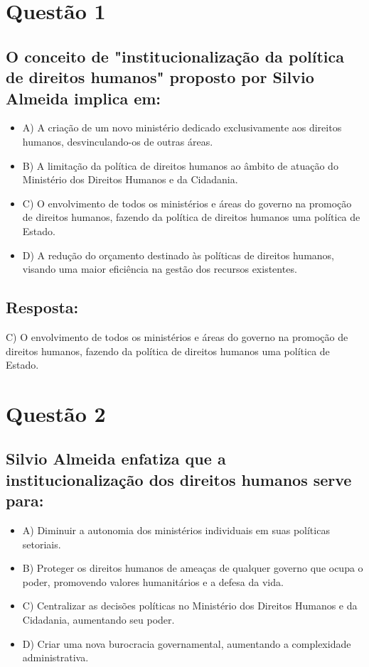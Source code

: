 \documentclass[
   article,       
   12pt,          
   oneside,       
   a4paper,       
   english,       
   brazil,        
   sumario=tradicional
   ]{abntex2}
\begin{document}
\section{Questão 1}
\subsection*{O conceito de "institucionalização da política de direitos humanos" proposto por Silvio Almeida implica em:}
\begin{itemize}
    \item A) A criação de um novo ministério dedicado exclusivamente aos direitos humanos, desvinculando-os de outras áreas.
    \item B) A limitação da política de direitos humanos ao âmbito de atuação do Ministério dos Direitos Humanos e da Cidadania.
    \item C) O envolvimento de todos os ministérios e áreas do governo na promoção de direitos humanos, fazendo da política de direitos humanos uma política de Estado.
    \item D) A redução do orçamento destinado às políticas de direitos humanos, visando uma maior eficiência na gestão dos recursos existentes.
\end{itemize}
\subsection{Resposta:}
C) O envolvimento de todos os ministérios e áreas do governo na promoção de direitos humanos, fazendo da política de direitos humanos uma política de Estado.


\section{Questão 2}
\subsection*{Silvio Almeida enfatiza que a institucionalização dos direitos humanos serve para:}
\begin{itemize}
    \item A) Diminuir a autonomia dos ministérios individuais em suas políticas setoriais.
    \item B) Proteger os direitos humanos de ameaças de qualquer governo que ocupa o poder, promovendo valores humanitários e a defesa da vida.
    \item C) Centralizar as decisões políticas no Ministério dos Direitos Humanos e da Cidadania, aumentando seu poder.
    \item D) Criar uma nova burocracia governamental, aumentando a complexidade administrativa.
\end{itemize}
\end{document}
